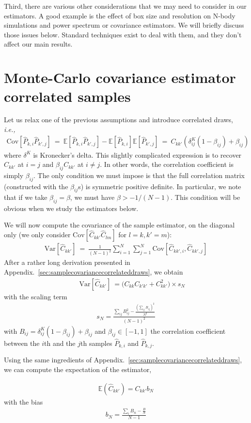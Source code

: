 \documentclass{aastex6}
\newcommand{\ie}{{\textit{i.e.,}~}}
\newcommand{\appref}[1]{{\xspace}Appendix.~\ref{#1}}
\newcommand{\eqn}[1]{\begin{eqnarray}#1\end{eqnarray}}
\begin{document}
Third, there are various other considerations that we may need to consider in our estimators. A good example is the effect of box size and resolution on N-body simulations and power spectrum or covariance estimators. 
We will briefly discuss those issues below. Standard techniques exist to deal with them, and they don't affect our main results.

\section{Monte-Carlo covariance estimator correlated samples}


Let us relax one of the previous assumptions and introduce correlated draws, \ie
\eqn{
	\mathrm{Cov}[\hat{P}_{k, i}\hat{P}_{k', j}] \ = \ \mathbb{E}[\hat{P}_{k, i}\hat{P}_{k', j}] - \mathbb{E}[\hat{P}_{k, i}]\mathbb{E}[\hat{P}_{k', j}]  \ =  \ C_{kk'} \left( \delta^K_{ij}(1-\beta_{ij}) + \beta_{ij} \right)
}
where $\delta^K$ is Kronecker's delta. This slightly complicated expression is to recover $C_{kk'}$ at $i=j$ and $\beta_{ij}C_{kk'}$ at $i\neq j$. In other words, the correlation coefficient is simply $\beta_{ij}$. The only condition we must impose is that the full correlation matrix (constructed with the $\beta_{ij}$s) is symmetric positive definite. In particular, we note that if we take $\beta_{ij}=\beta$, we must have $\beta > -1/(N-1)$. This condition will be obvious when we study the estimators below.

We will now compute the covariance of the sample estimator, on the diagonal only (we only consider $\mathrm{Cov}[\hat{C}_{kk'}\hat{C}_{lm}]$ for $l=k, k'=m$):
\eqn{
	\mathrm{Var}[\hat{C}_{kk'}] \ =\    \frac{1}{(N-1)^2}\sum_{i=1}^{N}\sum_{j=1}^{N} \mathrm{Cov}[\hat{C}_{kk',i} , \hat{C}_{kk',j} ]
}
After a rather long derivation presented in \appref{sec:samplecovariancecorrelateddraws}, we obtain
\eqn{
	&&  \ \mathrm{Var}[\hat{C}_{kk'}] \ =    \bigl(C_{kk}C_{k'k'} + C_{kk'}^2 \bigr) \times s_N
}
with the scaling term 
\eqn{
	s_N = \frac{ \sum_{ij} B_{ij}^2  - \frac{(\sum_{ij} B_{ij})^2}{N^2}}{(N-1)^2}
}
	 with $B_{ij} =  \delta^K_{ij}(1-\beta_{ij}) + \beta_{ij} $ and $\beta_{ij} \in [-1, 1]$ the correlation coefficient between the $i$th and the $j$th samples $\hat{P}_{k, i}$ and $\hat{P}_{k, j}$. 

Using the same ingredients of \appref{sec:samplecovariancecorrelateddraws}, we can compute the expectation of the estimator,

\eqn{
	\mathbb{E}(\hat{C}_{kk'}) = C_{kk'} b_N
}
with the bias
\eqn{
	b_N = \frac{\sum_i B_{ii} - \frac{B}{N}}{N-1}
}
\end{document}
